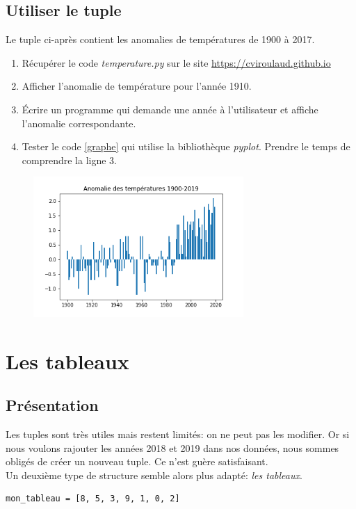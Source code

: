 \documentclass[a4paper,11pt]{article}
\begin{document}
\begin{Form}
\subsection{Utiliser le tuple}
Le tuple ci-après contient les anomalies de températures de 1900 à 2017.

\begin{activite}
\begin{enumerate}
\item Récupérer le code \emph{temperature.py} sur le site \url{https://cviroulaud.github.io}
\item Afficher l'anomalie de température pour l'année 1910.
\item Écrire un programme qui demande une année à l'utilisateur et affiche l'anomalie correspondante.
\item Tester le code \ref{graphe} qui utilise la bibliothèque \emph{pyplot}. Prendre le temps de comprendre la ligne 3.
\end{enumerate}
\begin{center}

\label{graphe}
\end{center}
\end{activite}
\begin{figure}[!h]
\centering
\includegraphics[width=8cm]{ressources/temp.png}
\label{resgraphe}
\end{figure}
\section{Les tableaux}
\subsection{Présentation}
Les tuples sont très utiles mais restent limités: on ne peut pas les modifier. Or si nous voulons rajouter les années 2018 et 2019 dans nos données, nous sommes obligés de créer un nouveau tuple. Ce n'est guère satisfaisant.\\
Un deuxième type de structure semble alors plus adapté: \emph{les tableaux}.
\begin{code}[!h]
\begin{lstlisting}
mon_tableau = [8, 5, 3, 9, 1, 0, 2]
\end{lstlisting}
\label{tableau}
\end{code}


\end{Form}
\end{document}
